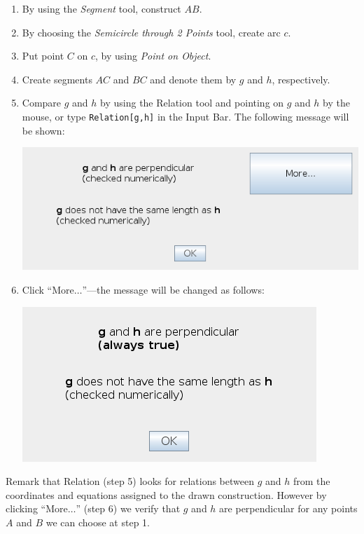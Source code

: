 \documentclass{article}
\begin{document}
\begin{enumerate}
    \item By using the \textit{Segment} tool, construct $AB$.
    \item By choosing the \textit{Semicircle through 2 Points} tool, create arc $c$.
    \item Put point $C$ on $c$, by using \textit{Point on Object}.
    \item Create segments $AC$ and $BC$ and denote them by $g$ and $h$, respectively.
    \item Compare $g$ and $h$ by using the Relation tool and pointing on $g$ and $h$ by the mouse, or type \texttt{Relation[g,h]} in the Input Bar. The following message will be shown:
    \begin{center}
    \includegraphics[scale=0.5]{Relation-example-Relation1}
    \end{center}
    \item Click ``More$\ldots$''---the message will be changed as follows:
    \begin{center}
    \includegraphics[scale=0.5]{Relation-example-Relation2}
    \end{center}
    
\end{enumerate}

Remark that Relation (step 5) looks for relations between $g$ and $h$ from the coordinates and equations assigned to the drawn construction. However by clicking ``More$\ldots$'' (step 6) we verify that $g$ and $h$ are perpendicular for any points $A$ and $B$ we can choose at step 1.
\end{document}
